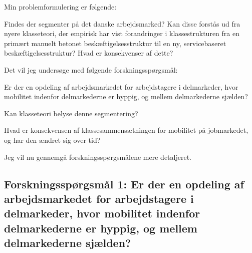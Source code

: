 Min problemformulering er følgende:


%
\vspace{\baselineskip}
%
\begin{tcolorbox}[title=\textbf{Problemformulering}, 
subtitle style={boxrule=0.4pt}, colbacktitle=deepcarrotorange!99!white,colback=trolleygrey!30!white,coltitle=black]
Findes der segmenter på det danske arbejdsmarked? Kan disse forstås ud fra nyere klasseteori, der empirisk har vist forandringer i klassestrukturen fra en primært manuelt betonet beskæftigelsesstruktur til en ny, servicebaseret beskæftigelsesstruktur? Hvad er konsekvenser af dette?
\end{tcolorbox}
%
\vspace{\baselineskip}
Det vil jeg undersøge med følgende forskningsspørgsmål:
\vspace{\baselineskip}
\begin{tcolorbox}[title=\textbf{Forskningspørgsmål},
subtitle style={boxrule=0.4pt}, colbacktitle=deepcarrotorange!99!white,colback=trolleygrey!30!white,coltitle=black]
	
	 Er der en opdeling af arbejdsmarkedet for arbejdstagere i delmarkeder, hvor mobilitet indenfor delmarkederne er hyppig, og mellem delmarkederne sjælden?
	
	 Kan klasseteori belyse denne segmentering?

	 Hvad er konsekvensen af klassesammensætningen for mobilitet på jobmarkedet, og har den ændret sig over tid?
	

\end{tcolorbox}


Jeg vil nu gennemgå forskningsspørgsmålene mere detaljeret.

\subsection[Forskningsspørgsmål 1]{Forskningsspørgsmål 1: \linebreak \small Er der en opdeling af arbejdsmarkedet for arbejdstagere i delmarkeder, hvor mobilitet indenfor delmarkederne er hyppig, og mellem delmarkederne sjælden?}

